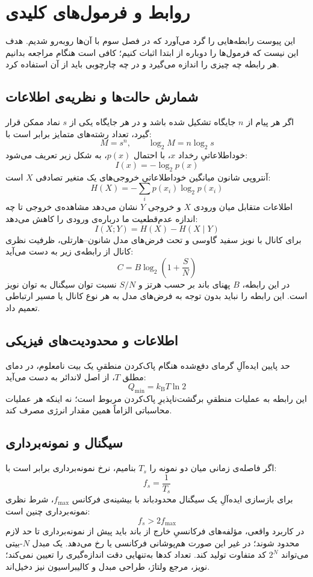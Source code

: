 \appendix
\chapter{روابط و فرمول‌های کلیدی}
\label{app:key-equations}

این پیوست رابطه‌هایی را گرد می‌آورد که در فصل سوم با آن‌ها روبه‌رو شدیم.
هدف این نیست که فرمول‌ها را دوباره از ابتدا اثبات کنیم؛ کافی است هنگام
مراجعه بدانیم هر رابطه چه چیزی را اندازه می‌گیرد و در چه چارچوبی باید
از آن استفاده کرد.

\section{شمارش حالت‌ها و نظریه‌ی اطلاعات}
اگر هر پیام از \(n\) جایگاه تشکیل شده باشد و در هر جایگاه یکی از
\(s\) نماد ممکن قرار گیرد، تعداد رشته‌های متمایز برابر است با:
\[
  M=s^n, \qquad \log_2 M=n\log_2 s
\]
خوداطلاعاتیِ رخداد \(x\)، با احتمال \(p(x)\)، به شکل زیر تعریف می‌شود:
\[
  I(x)=-\log_2 p(x)
\]
آنتروپی شانون میانگین خوداطلاعاتیِ خروجی‌های یک متغیر تصادفی \(X\) است:
\[
  H(X)=-\sum_i p(x_i)\log_2 p(x_i)
\]
اطلاعات متقابل میان ورودی \(X\) و خروجی \(Y\) نشان می‌دهد مشاهده‌ی
خروجی تا چه اندازه عدم‌قطعیت ما درباره‌ی ورودی را کاهش می‌دهد:
\[
  I(X;Y)=H(X)-H(X\mid Y)
\]
برای کانال با نویز سفید گاوسی و تحت فرض‌های مدل شانون--هارتلی، ظرفیت
نظری کانال از رابطه‌ی زیر به دست می‌آید:
\[
  C=B\log_2\left(1+\frac{S}{N}\right)
\]
در این رابطه، \(B\) پهنای باند بر حسب هرتز و \(S/N\) نسبت توان سیگنال
به توان نویز است. این رابطه را نباید بدون توجه به فرض‌های مدل به هر
نوع کانال یا مسیر ارتباطی تعمیم داد.

\section{اطلاعات و محدودیت‌های فیزیکی}
حد پایین ایده‌آلِ گرمای دفع‌شده هنگام پاک‌کردن منطقیِ یک بیت نامعلوم،
در دمای مطلق \(T\)، از اصل لاندائر به دست می‌آید:
\[
  Q_{\min}=k_{\mathrm B}T\ln 2
\]
این رابطه به عملیات منطقیِ برگشت‌ناپذیرِ پاک‌کردن مربوط است؛ نه اینکه
هر عملیات محاسباتی الزاماً همین مقدار انرژی مصرف کند.

\section{سیگنال و نمونه‌برداری}
اگر فاصله‌ی زمانی میان دو نمونه را \(T_s\) بنامیم، نرخ نمونه‌برداری
برابر است با:
\[
  f_s=\frac{1}{T_s}
\]
برای بازسازی ایده‌آلِ یک سیگنال محدودباند با بیشینه‌ی فرکانس
\(f_{\max}\)، شرط نظری نمونه‌برداری چنین است:
\[
  f_s>2f_{\max}
\]
در کاربرد واقعی، مؤلفه‌های فرکانسیِ خارج از باند باید پیش از نمونه‌برداری
تا حد لازم محدود شوند؛ در غیر این صورت هم‌پوشانی فرکانسی یا
 رخ می‌دهد.
یک مبدل \(N\)-بیتی می‌تواند \(2^N\) کد متفاوت تولید کند. تعداد کدها
به‌تنهایی دقت اندازه‌گیری را تعیین نمی‌کند؛ نویز، مرجع ولتاژ، طراحی
مبدل و کالیبراسیون نیز دخیل‌اند.

